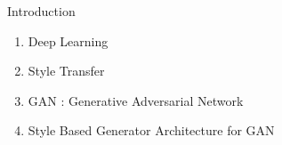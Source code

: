 
{
\begin{frame}[fragile]{Introduction}

    \begin{enumerate}
      \item Deep Learning 
      \item Style Transfer
      \item GAN : Generative Adversarial Network
      \item Style Based Generator Architecture for GAN
    \end{enumerate}

\end{frame}
}